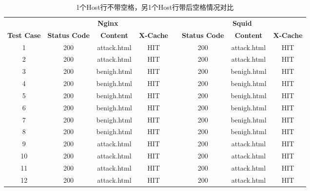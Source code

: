 \begin{table}
	\renewcommand\arraystretch{1.1}      %
	\caption{1个Host行不带空格，另1个Host行带后空格情况对比}
	\vspace{1.2mm}                  %
	\centering                            %
	{\tabcolsep  0.05in                    %
		\begin{tabular}{cccccccc}
			\hline
			& \multicolumn{3}{c}{\textbf{Nginx}} & & \multicolumn{3}{c}{\textbf{Squid}}\\
			\cline{2-4}\cline{6-8}
			\textbf{Test Case}& \textbf{Status Code} & \textbf{Content}  & \textbf{X-Cache}  & &  \textbf{Status Code}  & \textbf{Content} & \textbf{X-Cache}\\
			\hline
			1 &   200  &  attack.html  &  HIT  & &  200  &  attack.html  &  HIT \\
			2 &  200 &   attack.html &  HIT  & &  200  &  attack.html  &  HIT \\
			3 &  200  &  benigh.html &  HIT  & &  200  &  benigh.html  &  HIT \\
			4 &  200 &  benigh.html &  HIT      & &  200 & benigh.html  &  HIT \\
			5 &  200 &  benigh.html  &  HIT  & &  200 &  benigh.html  &  HIT \\
			6 &  200 &  benigh.html  &  HIT     & &  200 & benigh.html     &  HIT \\
			7 &   200  &  benigh.html  &  HIT  & &  200  &  benigh.html  &  HIT \\
			8 &  200 &  benigh.html  &  HIT  & &  200  &  benigh.html  &  HIT \\
			9 &  200  &  attack.html &  HIT  & &  200  &  attack.html  &  HIT \\
			10 &  200 &  attack.html&  HIT      & &  200 & attack.html   &  HIT \\
			11 &  200 &  attack.html  &  HIT  & &  200 &  attack.html  &  HIT \\
			12 &  200 &  attack.html  &  HIT     & &  200 & attack.html     &  HIT \\
			\hline
		\end{tabular}
	}
\end{table}


